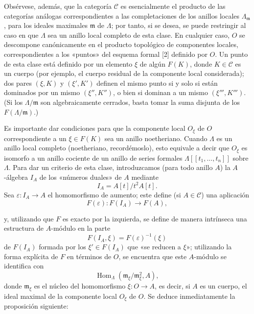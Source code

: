 Obsérvese, además, que la categoría $\mathcal C$ es esencialmente el producto
de las categorías análogas correspondientes a las completaciones de los
anillos locales $\Lambda_{\mathfrak m}$, para los ideales maximales
$\mathfrak m$ de $\Lambda$; por tanto, si se desea, se puede restringir al caso
en que $\Lambda$ sea un anillo local completo de esta clase. En cualquier caso,
$O$ se descompone canónicamente en el producto topológico de componentes
locales, correspondientes a los «puntos» del esquema formal [2] definido por
$O$. Un punto de esta clase está definido por un elemento $\xi$ de algún
$F(K)$, donde $K\in\mathcal C$ es un cuerpo (por ejemplo, el cuerpo residual
de la componente local considerada); dos pares $(\xi,K)$ y $(\xi',K')$
definen el mismo punto si y solo si están dominados por un mismo
$(\xi'',K'')$, o bien si dominan a un mismo $(\xi''',K''')$. (Si los
$\Lambda/\mathfrak m$ son algebraicamente cerrados, basta tomar la suma
disjunta de los $F(\Lambda/\mathfrak m)$.)

Es importante dar condiciones para que la componente local $O_\xi$ de $O$
correspondiente a un $\xi\in F(K)$ sea un anillo noetheriano. Cuando $\Lambda$
es un anillo local completo (noetheriano, recordémoslo), esto equivale a decir
que $O_\xi$ es isomorfo a un anillo cociente de un anillo de series formales
$\Lambda[[t_1,\ldots,t_n]]$ sobre $\Lambda$. Para dar un criterio de esta clase,
introduzcamos (para todo anillo $A$) la $A$-álgebra $I_A$ de los «números
duales» de $A$ mediante
\[
  I_A=A[t]/t^2A[t].
\]
Sea $\varepsilon:I_A\longrightarrow A$ el homomorfismo de aumento; este define
(si $A\in\mathcal C$) una aplicación
\[
  F(\varepsilon):F(I_A)\longrightarrow F(A),
\]

y, utilizando que $F$ es exacto por la izquierda, se define de manera
intrínseca una estructura de $A$-módulo en la parte
\[
  F(I_A,\xi)=F(\varepsilon)^{-1}(\xi)
\]
de $F(I_A)$ formada por los $\xi'\in F(I_A)$ que «se reducen a $\xi$»;
utilizando la forma explícita de $F$ en términos de $O$, se encuentra que este
$A$-módulo se identifica con
\[
  \operatorname{Hom}_{\Lambda}(\mathfrak m_\xi/\mathfrak m_\xi^2,A),
\]
donde $\mathfrak m_\xi$ es el núcleo del homomorfismo
$\xi:O\longrightarrow A$, es decir, si $A$ es un cuerpo, el ideal maximal de
la componente local $O_\xi$ de $O$. Se deduce inmediatamente la proposición
siguiente:

